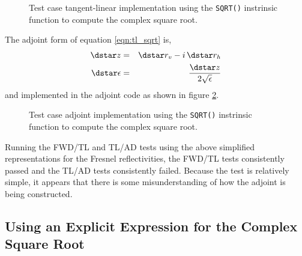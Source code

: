 \begin{figure}[htp]
  \centering
  \caption{Test case tangent-linear implementation using the \texttt{SQRT()} instrinsic function to compute the complex square root.}
  \label{fig:tl_code_intrinsic}
\end{figure}

The adjoint form of equation \ref{eqn:tl_sqrt} is,
\begin{eqnarray}
  \dstar z &=& \dstar r_v - i\,\dstar r_h\nonumber\\
  \dstar\epsilon &=& \frac{\dstar z}{2\sqrt{\epsilon}}
  \label{eqn:ad_sqrt}
\end{eqnarray}
and implemented in the adjoint code as shown in figure \ref{fig:ad_code_intrinsic}.

\begin{figure}[htp]
  \centering
  \caption{Test case adjoint implementation using the \texttt{SQRT()} instrinsic function to compute the complex square root.}
  \label{fig:ad_code_intrinsic}
\end{figure}

Running the FWD/TL and TL/AD tests using the above simplified representations for the Fresnel reflectivities, the FWD/TL tests consistently passed and the TL/AD tests consistently failed. Because the test is relatively simple, it appears that there is some misunderstanding of how the adjoint is being constructed.


\subsection{Using an Explicit Expression for the Complex Square Root}

